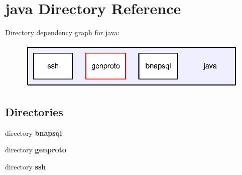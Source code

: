 \section{java Directory Reference}
\label{dir_93c6ba7fb77bae0709fae89c9c13b44a}
Directory dependency graph for java\+:
\nopagebreak
\begin{figure}[H]
\begin{center}
\leavevmode
\includegraphics[width=348pt]{dir_93c6ba7fb77bae0709fae89c9c13b44a_dep}
\end{center}
\end{figure}
\subsection*{Directories}
\begin{DoxyCompactItemize}
\item 
directory {\bf bnapsql}
\item 
directory {\bf genproto}
\item 
directory {\bf ssh}
\end{DoxyCompactItemize}
